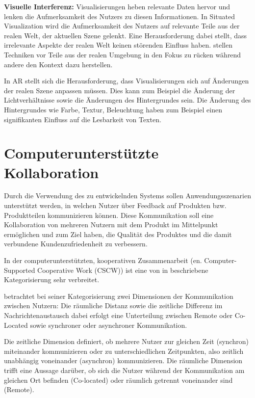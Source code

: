 \textbf{Visuelle Interferenz:}
Visualisierungen heben relevante Daten hervor und lenken die Aufmerksamkeit des Nutzers zu diesen Informationen. In Situated Visualization 
wird die Aufmerksamkeit des Nutzers auf relevante Teile aus der realen Welt, der aktuellen Szene gelenkt. Eine Herausforderung dabei stellt, dass irrelevante Aspekte der realen Welt 
keinen störenden Einfluss haben.\cite[S.~243]{DieterSchmalstieg2016} \citeauthor{Kalkofen2007} stellen Techniken vor Teile aus der realen Umgebung in den Fokus zu rücken während andere den Kontext dazu herstellen. \cite{Kalkofen2007}  

In AR stellt sich die Herausforderung, dass Visualisierungen sich auf Änderungen der realen Szene anpassen müssen. Dies kann zum Beispiel die Änderung der Lichtverhältnisse sowie die 
Änderungen des Hintergrundes sein. Die Änderung des Hintergrundes wie Farbe, Textur, Beleuchtung haben zum Beispiel einen signifikanten Einfluss auf die Lesbarkeit von Texten. \cite{Gabbard}   

\section{Computerunterstützte Kollaboration}

Durch die Verwendung des zu entwickelnden Systems sollen Anwendungsszenarien unterstützt werden, in welchen Nutzer 
über Feedback auf Produkten bzw. Produktteilen kommunizieren können. Diese Kommunikation soll eine Kollaboration von 
mehreren Nutzern mit dem Produkt im Mittelpunkt ermöglichen und zum Ziel haben, die Qualität des Produktes und die 
damit verbundene Kundenzufriedenheit zu verbessern.     

In der computerunterstützten, kooperativen Zusammenarbeit (en. Computer-Supported Cooperative Work (CSCW)) 
ist eine von \citeauthor{Rodden1992} in \cite[S.~2]{Rodden1992} beschriebene Kategorisierung sehr verbreitet.  


\citeauthor{Rodden1992} betrachtet bei seiner Kategorisierung zwei Dimensionen der Kommunikation zwischen Nutzern: 
Die räumliche Distanz sowie die zeitliche Differenz im Nachrichtenaustausch dabei erfolgt eine Unterteilung zwischen 
Remote oder Co-Located sowie synchroner oder asynchroner Kommunikation.

Die zeitliche Dimension definiert, ob mehrere Nutzer zur gleichen Zeit (synchron) miteinander kommunizieren 
oder zu unterschiedlichen Zeitpunkten, also zeitlich unabhängig voneinander (asynchron) kommunizieren. Die räumliche Dimension trifft eine Aussage darüber, ob sich die Nutzer während der Kommunikation am gleichen Ort befinden (Co-located) oder räumlich getrennt voneinander sind (Remote). 

